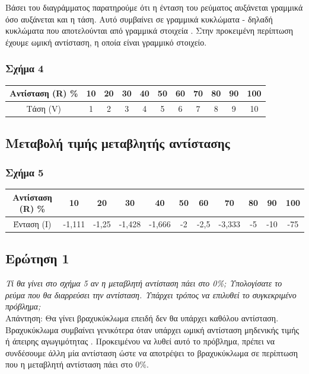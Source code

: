 \documentclass{article}
\begin{document}
Βάσει του διαγράμματος παρατηρούμε ότι η ένταση του ρεύματος αυξάνεται γραμμικά
όσο αυξάνεται και η τάση. Αυτό συμβαίνει σε γραμμικά κυκλώματα - δηλαδή κυκλώματα
που αποτελούνται από γραμμικά στοιχεία \cite{papadopoulos}. Στην προκειμένη περίπτωση
έχουμε ωμική αντίσταση, η οποία είναι γραμμικό στοιχείο. \\
	
\subsubsection{Σχήμα 4}

\begin{center}
\begin{tabular}{|c|c|c|c|c|c|c|c|c|c|c|}
	\hline
	Αντίσταση (R) \%	& 10 & 20 & 30 & 40 & 50 & 60 & 70 & 80 & 90 & 100 \\
	\hline
	Τάση (\si{\volt})	& 1 & 2 & 3 & 4 & 5 & 6 & 7 &	8 & 9 & 10 \\
	\hline
\end{tabular}
\end{center}

\subsection{Μεταβολή τιμής μεταβλητής αντίστασης}
\subsubsection{Σχήμα 5}

\begin{center}
\begin{tabular}{|c|c|c|c|c|c|c|c|c|c|c|}
	\hline
	Αντίσταση (R) \%	& 10 & 20 & 30 & 40 & 50 & 60 & 70 & 80 & 90 & 100 \\
	\hline
	Ένταση (I) & -1,111 & -1,25 & -1,428 & -1,666 & -2 & -2,5 & -3,333 & -5 & -10 & -75 \\
	\hline
\end{tabular}
\end{center}

\subsection{Ερώτηση 1}
\textit{Τί θα γίνει στο σχήμα 5 αν η μεταβλητή αντίσταση πάει στο 0\%; Υπολογίσατε το
ρεύμα που θα διαρρεύσει την αντίσταση. Υπάρχει τρόπος να επιλυθεί το συγκεκριμένο
πρόβλημα;} \\

Απάντηση: Θα γίνει βραχυκύκλωμα επειδή δεν θα υπάρχει καθόλου αντίσταση. Βραχυκύκλωμα
συμβαίνει γενικότερα όταν υπάρχει ωμική αντίσταση μηδενικής τιμής ή
άπειρης αγωγιμότητας \cite{papadopoulos}. Προκειμένου να λυθεί αυτό το πρόβλημα, πρέπει
να συνδέσουμε άλλη μία αντίσταση ώστε να αποτρέψει το βραχυκύκλωμα σε περίπτωση που η
μεταβλητή αντίσταση πάει στο 0\%.
\end{document}

